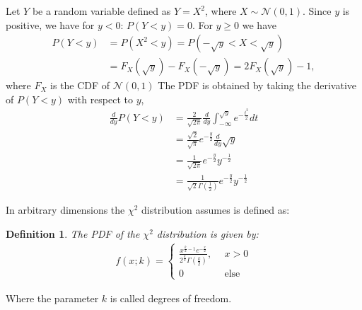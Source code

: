 \documentclass[10pt,a4paper]{article}
\newtheorem{definition}{Definition}
\begin{document}
Let $Y$ be a random variable defined as $Y=X^2$, where $X\sim \mathcal N (0,1)$.
Since $y$ is positive, we have for $y<0$: $P(Y<y)=0$. For $y \geq 0$ we have
\begin{align*}
P(Y<y) & = P(X^2 < y) = P(-\sqrt y < X < \sqrt y) \\
& =  F_X(\sqrt y) - F_X(-\sqrt y) = 2 F_X(\sqrt y) -1 ,
\end{align*}
where $F_X$ is the CDF of $\mathcal{N}(0,1)$ The PDF is obtained by taking the derivative of $P(Y<y)$ with respect to $y$,
\begin{align*}
\frac{d}{d y} P(Y<y) & = \frac{2}{\sqrt{2\pi}}\frac{d}{dy} \int_{-\infty}^{\sqrt y} e ^{-\frac{t^2}{2}} dt \\
					 & = \frac{\sqrt 2}{\sqrt{\pi}}e ^{-\frac{y}{2}} \frac{d}{dy} \sqrt y  \\
					 & = \frac{1}{\sqrt{2 \pi}}e ^{-\frac{y}{2}} y ^{-\frac{1}{2}}  \\ 
					 & = \frac{1}{\sqrt 2  \Gamma(\frac{1}{2})}e ^{-\frac{y}{2}} y ^{-\frac{1}{2}}
\end{align*}

In arbitrary dimensions the $\chi^2$ distribution assumes is defined as:

\begin{definition}
The PDF of the $\chi^2$ distribution is given by:
\begin{align}
f(x;k) = 
\begin{cases}
 \frac{x^{\frac{k}{2}-1} e^{-\frac{x}{2}}}{2^{\frac{k}{2}}\Gamma(\frac{k}{2})}, ~~ &x>0 \\
 0 		  &\text{else}
\end{cases}
\end{align}
\end{definition}
Where the parameter $k$  is called degrees of freedom.
\end{document}
